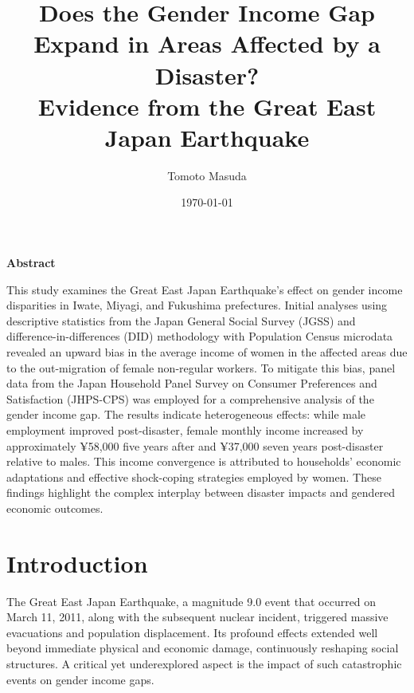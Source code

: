 \documentclass[a4paper,12pt]{article}
\begin{document}
\title{Does the Gender Income Gap Expand in Areas Affected by a Disaster? \\ Evidence from the Great East Japan Earthquake}

\author{Tomoto Masuda}


\date{\today}

\maketitle

\begin{center}
    \textbf{Abstract}
\end{center}

\noindent

This study examines the Great East Japan Earthquake's effect on gender income disparities in Iwate, Miyagi, and Fukushima prefectures. Initial analyses using descriptive statistics from the Japan General Social Survey (JGSS) and difference-in-differences (DID) methodology with Population Census microdata revealed an upward bias in the average income of women in the affected areas due to the out-migration of female non-regular workers. To mitigate this bias, panel data from the Japan Household Panel Survey on Consumer Preferences and Satisfaction (JHPS-CPS) was employed for a comprehensive analysis of the gender income gap. The results indicate heterogeneous effects: while male employment improved post-disaster, female monthly income increased by approximately ¥58,000 five years after and ¥37,000 seven years post-disaster relative to males. This income convergence is attributed to households' economic adaptations and effective shock-coping strategies employed by women. These findings highlight the complex interplay between disaster impacts and gendered economic outcomes.

\newpage


\tableofcontents


\clearpage
\section{Introduction}

The Great East Japan Earthquake, a magnitude 9.0 event that occurred on March 11, 2011, along with the subsequent nuclear incident, triggered massive evacuations and population displacement. Its profound effects extended well beyond immediate physical and economic damage, continuously reshaping social structures. A critical yet underexplored aspect is the impact of such catastrophic events on gender income gaps.
\end{document}
